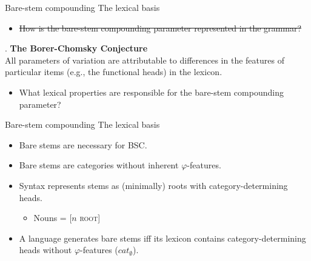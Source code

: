 \documentclass[Proposal]{subfiles}
\begin{document}
\begin{frame}
  {Bare-stem compounding}
  {The lexical basis}

  \begin{itemize}
    \item \sout<3->{How is the bare-stem compounding parameter represented in the grammar?}
  \end{itemize}
  \pause
  \ex. \textbf{The Borer-Chomsky Conjecture} \parencite{baker2008microparameter}\\
  All parameters of variation are attributable to differences in the features of particular items (e.g., the functional heads) in the lexicon.

  \begin{itemize}
      \pause
    \item What lexical properties are responsible for the bare-stem compounding parameter?
  \end{itemize}
\end{frame}
\begin{frame}
  {Bare-stem compounding}
  {The lexical basis}
  \begin{itemize}
    \item<1-> Bare stems are necessary for BSC.
    \item<2-> Bare stems are categories without inherent $\varphi$-features. \parencite[see also][]{lasnik1999verbal}
    \item<3-> Syntax represents stems as (minimally) roots with category-determining heads.
      \begin{itemize}
	\item<3-> Nouns = [$n$ \textsc{root}]
      \end{itemize}
    \item<4-> A language generates bare stems iff its lexicon contains category-determining heads without $\varphi$-features ($cat_\emptyset$).
  \end{itemize}
\end{frame}
\end{document}
